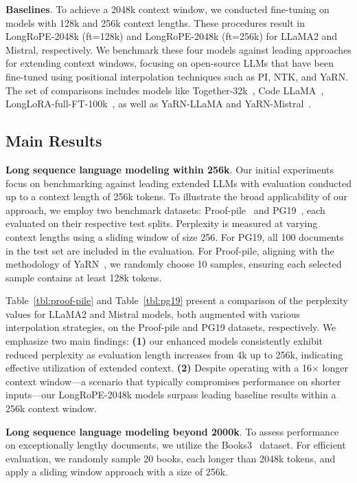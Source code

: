 \textbf{Baselines}. To achieve a 2048k context window, we conducted fine-tuning on models with 128k and 256k context lengths. These procedures result in LongRoPE-2048k (ft=128k) and LongRoPE-2048k (ft=256k) for LLaMA2 and Mistral, respectively. We benchmark these four models against leading approaches for extending context windows, focusing on open-source LLMs that have been fine-tuned using positional interpolation techniques such as PI, NTK, and YaRN. The set of comparisons includes models like Together-32k~\cite{together}, Code LLaMA~\cite{codellama}, LongLoRA-full-FT-100k~\cite{longlora}, as well as YaRN-LLaMA and YaRN-Mistral~\cite{yarn}.

\subsection{Main Results}

\label{sec:mainresult}
\textbf{Long sequence language modeling within 256k}. Our initial experiments focus on benchmarking against leading extended LLMs with evaluation conducted up to a context length of 256k tokens. To illustrate the broad applicability of our approach, we employ two benchmark datasets: Proof-pile~\cite{pg19} and PG19~\cite{pile}, each evaluated on their respective test splits. Perplexity is measured at varying context lengths using a sliding window of size 256. For PG19, all 100 documents in the test set are included in the evaluation. For Proof-pile, aligning with the methodology of YaRN~\cite{yarn}, we randomly choose 10 samples, ensuring each selected sample contains at least 128k tokens.

Table~\ref{tbl:proof-pile} and Table~\ref{tbl:pg19} present a comparison of the perplexity values for LLaMA2 and Mistral models, both augmented with various interpolation strategies, on the Proof-pile and PG19 datasets, respectively. We emphasize two main findings: \textbf{(1)} our enhanced models consistently exhibit reduced perplexity as evaluation length increases from 4k up to 256k, indicating effective utilization of extended context. \textbf{(2)} Despite operating with a 16$\times$ longer context window—a scenario that typically compromises performance on shorter inputs—our LongRoPE-2048k models surpass leading baseline results within a 256k context window.

\textbf{Long sequence language modeling beyond 2000k}. To assess performance on exceptionally lengthy documents, we utilize the Books3~\cite{pile} dataset. For efficient evaluation, we randomly sample 20 books, each longer than 2048k tokens, and apply a sliding window approach with a size of 256k.

